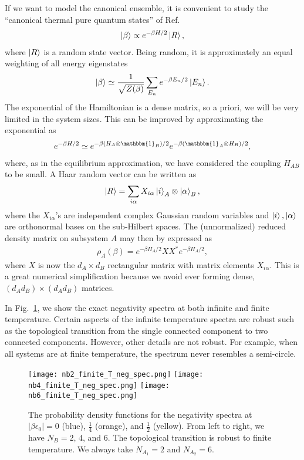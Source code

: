\documentclass[a4paper,11pt]{article}
\begin{document}
\begin{enumerate}
If we want to model the canonical ensemble, it is convenient to study the ``canonical thermal pure quantum states'' of Ref.~\cite{2013PhRvL.111a0401S}
\begin{align}
 \ket{\beta} \propto e^{-\beta H/2}\ket{R}, 
\end{align}
where $\ket{R}$ is a random state vector. Being random, it is approximately an equal weighting of all energy eigenstates
\begin{align}
 \ket{\beta} \simeq \frac{1}{\sqrt{Z(\beta)}} \sum_{E_n }e^{-\beta E_n/2}\ket{E_n}.
\end{align}
The exponential of the Hamiltonian is a dense matrix, so a priori, we will be very limited in the system sizes. This can be improved by approximating the exponential as
\begin{align}
 e^{-\beta H/2} \simeq e^{-\beta (H_A\otimes \mathbbm{1}_B)/2}e^{-\beta (\mathbbm{1}_A\otimes H_B)/2},
\end{align}
where, as in the equilibrium approximation, we have considered the coupling $H_{AB}$ to be small. A Haar random vector can be written as \cite{2009arXiv0910.1768C}
\begin{align}
 \ket{R} = \sum_{i\alpha} X_{i\alpha} \ket{i}_A\otimes\ket{\alpha}_B,
\end{align}
where the $X_{i\alpha}$'s are independent complex Gaussian random variables and $\ket{i}, \ket{\alpha}$ are orthonormal bases on the sub-Hilbert spaces. The (unnormalized) reduced density matrix on subsystem $A$ may then by expressed as 
\begin{align}
 \rho_A(\beta) = e^{-\beta H_A/2}XX^*e^{-\beta H_A/2},
\end{align}
where $X$ is now the $d_A \times d_B$ rectangular matrix with matrix elements $X_{i\alpha}$. This is a great numerical simplification because we avoid ever forming dense, $(d_A d_B) \times (d_A d_B)$ matrices.

In Fig.~\ref{finiteT_neg_Renyi}, we show the exact negativity spectra at both infinite and finite temperature. Certain aspects of the infinite temperature spectra are robust such as the topological transition from the single connected component to two connected components. However, other details are not robust. For example, when all systems are at finite temperature, the spectrum never resembles a semi-circle. 

\begin{figure}[]
 \centering
 \texttt{[image: nb2\_finite\_T\_neg\_spec.png]}
 \texttt{[image: nb4\_finite\_T\_neg\_spec.png]}
\texttt{[image: nb6\_finite\_T\_neg\_spec.png]}
 \caption{The probability density functions for the negativity spectra at $|\beta\epsilon_0| = 0$ (blue), $\frac{1}{4}$ (orange), and $\frac{1}{2}$ (yellow). From left to right, we have $N_B = 2$, $4$, and $6$. The topological transition is robust to finite temperature. We always take $N_{A_1} = 2$ and $N_{A_2} = 6$.}
 \label{finiteT_neg_Renyi}
\end{figure}


\end{enumerate}
\end{document}

